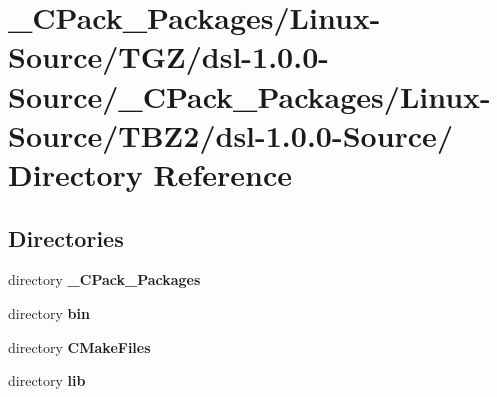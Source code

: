 \section{\_\-CPack\_\-Packages/Linux-\/Source/TGZ/dsl-\/1.0.0-\/Source/\_\-CPack\_\-Packages/Linux-\/Source/TBZ2/dsl-\/1.0.0-\/Source/ Directory Reference}
\label{dir_989545f29129f336f990480116bd75ae}
\subsection*{Directories}
\begin{DoxyCompactItemize}
\item 
directory {\bf \_\-CPack\_\-Packages}
\item 
directory {\bf bin}
\item 
directory {\bf CMakeFiles}
\item 
directory {\bf lib}
\end{DoxyCompactItemize}
